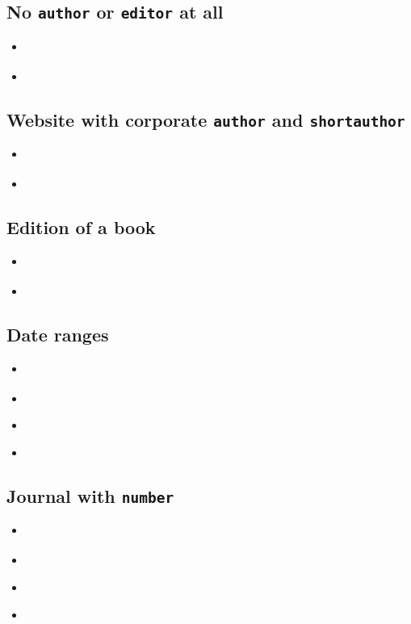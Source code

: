 \documentclass[a4paper,12pt]{scrartcl}
\newcommand*{\Feld}[1]{\texttt{#1}}
\begin{document}
\subsection{No \Feld{author} or \Feld{editor} at all}
\begin{itemize}
    \item\cite{domino:1780}%
    \item{}%
\end{itemize}

\subsection{Website with corporate \Feld{author} and \Feld{shortauthor}}
\begin{itemize}
    \item\cite{kenmore}%
    \item{}%
\end{itemize}

\subsection{Edition of a book}
\begin{itemize}
    \item\cite{fuchs:kh:et:al:1998}%
    \item{}%
\end{itemize}

\subsection{Date ranges}
\begin{itemize}
    \item\cite{bhattacharyya:1973}%
    \item{}%
    \item\cite{cossel:1933-35}%
    \item{}%
\end{itemize}

\subsection{Journal with \Feld{number}}
\begin{itemize}
    \item\cite{arora:becker:1997}%
    \item{}%
	\item\cite{asmus:1938}%
    \item{}%
\end{itemize}
\end{document}
